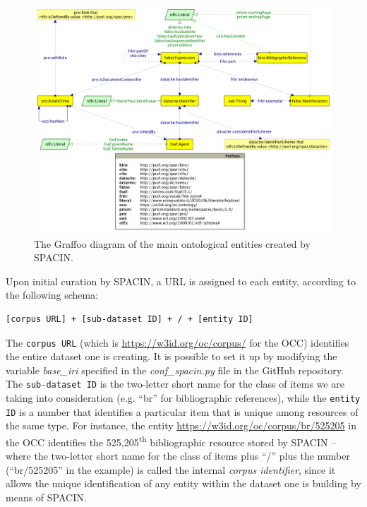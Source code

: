 \documentclass[runningheads,a4paper]{llncs}
\makeatletter
\def\maxwidth#1{\ifdim\Gin@nat@width>#1 #1\else\Gin@nat@width\fi}
\makeatother
\begin{document}
\begin{figure}[h!]
\centering
\includegraphics[width=\maxwidth{\textwidth}]{img/10000000000004F1000003C40B1D2514.png}
\cprotect\caption{The Graffoo diagram  \cite{__RefNumPara__14746_1591320820}of the main ontological entities created by SPACIN.}
\label{refIllustration0}
\end{figure}


Upon initial curation by SPACIN, a URL is assigned to each entity, according to the following schema: 

\begin{lstlisting}[mathescape]
[corpus URL] + [sub-dataset ID] + / + [entity ID]
\end{lstlisting}

The \Verb+corpus URL+ (which is \url{https://w3id.org/oc/corpus/} for the OCC) identifies the entire dataset one is creating. It is possible to set it up by modifying the variable {\em base\_iri} specified in the {\em conf\_spacin.py} file in the GitHub repository. The \Verb+sub-dataset ID+ is the two-letter short name for the class of items we are taking into consideration (e.g. ``br'' for bibliographic references), while the \Verb+entity ID+ is a number that identifies a particular item that is unique among resources of the same type. For instance, the entity \url{https://w3id.org/oc/corpus/br/525205} in the OCC identifies the 525,205\textsuperscript{th} bibliographic resource stored by SPACIN -- where the two-letter short name for the class of items plus ``/'' plus the number (``br/525205'' in the example) is called the internal {\em corpus identifier}, since it allows the unique identification of any entity within the dataset one is building by means of SPACIN.
\end{document}
